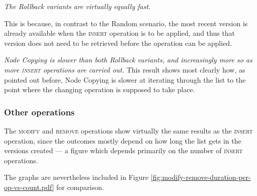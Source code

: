 \textit{The Rollback variants are virtually equally fast.}

This is because, in contrast to the Random scenario, the most recent version is
already available when the \textsc{insert} operation is to be applied, and thus
that version does not need to be retrieved before the operation can be applied.

\textit{Node Copying is slower than both Rollback variants, and increasingly
more so as more \textsc{insert} operations are carried out.} This result shows
most clearly how, as pointed out before, Node Copying is slower at iterating
through the list to the point where the changing operation is supposed to take
place.

\subsubsection{Other operations}
The \textsc{modify} and \textsc{remove} operations show virtually the same
results as the \textsc{insert} operation, since the outcomes mostly depend on
how long the list gets in the versions created --- a figure which depends
primarily on the number of \textsc{insert} operations.

The graphs are nevertheless included in Figure
\ref{fig:modify-remove-duration-per-op-vs-count.pdf} for comparison.

